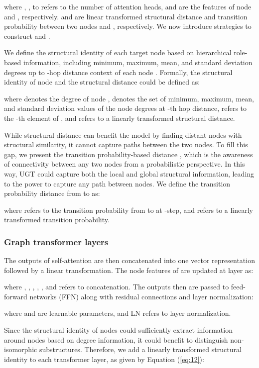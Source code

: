 \documentclass[oneside]{article}
\begin{document}
where ,  ,  to  refers to the number of attention heads,  and  are the features of node  and , respectively.
 and   are linear transformed structural distance  and transition probability  between two nodes  and , respectively.
We now introduce strategies to construct  and .

We define the structural identity of each target node based on hierarchical role-based information, including minimum, maximum, mean, and standard deviation degrees up to -hop distance context of each node .
Formally, the structural identity of node  and the structural distance could be defined as:

where  denotes the degree of node , 
 denotes the set of minimum, maximum, mean, and standard deviation values of the node degrees at -th hop distance,
 refers to the -th element of , 
and  refers to a linearly transformed structural distance. 


While structural distance can benefit the model by finding distant nodes with structural similarity, it cannot capture paths between the two nodes.
To fill this gap, we present the transition probability-based distance , which is the awareness of connectivity between any two nodes from a probabilistic perspective.
In this way, UGT could capture both the local and global structural information, leading to the power to capture any path between nodes.
We define the transition probability distance  from  to  as:

where  refers to the transition probability from  to  at -step,
and  refers to a linearly transformed transition probability.



\subsubsection{Graph transformer layers}

The outputs of self-attention are then concatenated into one vector representation followed by a linear transformation.
The node features of  are updated at layer  as:

where , , , , , and  refers to concatenation.
The outputs then are passed to feed-forward networks (FFN) along with residual connections and layer normalization:

where  and  are learnable parameters, and LN refers to layer normalization.




Since the structural identity of nodes could sufficiently extract information around nodes based on degree information, it could benefit to distinguish non-isomorphic substructures.
Therefore, we add a linearly transformed structural identity to each transformer layer, as given by Equation (\ref{eq:12}):
\end{document}
